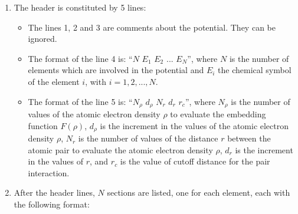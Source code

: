 \documentclass{article}
\begin{document}
\begin{enumerate}
	\item The header is constituted by 5 lines:
	
	\begin{itemize}
		\item The lines 1, 2 and 3 are comments about the potential. They can be ignored.
		\item The format of the line 4 is: ``$N$ $E_1$ $E_2$ $...$ $E_{N}$'', where $N$ is the number of elements which are involved in the potential and $E_i$ the chemical symbol of the element $i$, with $i=1,2,...,N$.  
		\item The format of the line 5 is: ``$N_{\rho}$ $d_{\rho}$ $N_r$ $d_r$ $r_{c}$'', where $N_{\rho}$ is the number of values of the atomic electron density $\rho$ to evaluate the embedding function $F(\rho)$, $d_{\rho}$ is the increment in the values of the atomic electron density $\rho$, $N_r$ is the number of values of the distance $r$ between the atomic pair to evaluate the atomic electron density $\rho$, $d_r$ is the increment in the values of $r$, and $r_{c}$ is the value of cutoff distance for the pair interaction. 
	\end{itemize}
	\item After the header lines, $N$ sections are listed, one for each element, each with the following format:
	

\end{enumerate}
\end{document}
